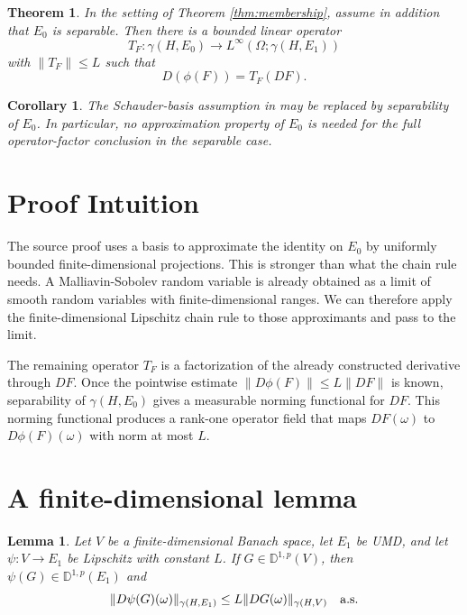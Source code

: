 \documentclass[11pt]{article}
\newtheorem{theorem}{Theorem}
\newtheorem{lemma}{Lemma}
\newtheorem{corollary}{Corollary}
\newcommand{\D}{\mathbb{D}}
\newcommand{\g}{\gamma}
\begin{document}
\begin{theorem}\label{thm:separable-factor}
In the setting of Theorem \ref{thm:membership}, assume in addition that
\(E_0\) is separable.  Then there is a bounded linear operator
\[
  T_F:\g(H,E_0)\to L^\infty(\Omega;\g(H,E_1))
\]
with \(\|T_F\|\leq L\) such that
\[
  D(\phi(F))=T_F(DF).
\]
\end{theorem}

\begin{corollary}
The Schauder-basis assumption in \cite[Proposition 3.10]{PV} may be replaced
by separability of \(E_0\).  In particular, no approximation property of
\(E_0\) is needed for the full operator-factor conclusion in the separable
case.
\end{corollary}

\section*{Proof Intuition}

The source proof uses a basis to approximate the identity on \(E_0\) by
uniformly bounded finite-dimensional projections.  This is stronger than what
the chain rule needs.  A Malliavin-Sobolev random variable is already obtained
as a limit of smooth random variables with finite-dimensional ranges.  We can
therefore apply the finite-dimensional Lipschitz chain rule to those
approximants and pass to the limit.

The remaining operator \(T_F\) is a factorization of the already constructed
derivative through \(DF\).  Once the pointwise estimate
\(\|D\phi(F)\|\leq L\|DF\|\) is known, separability of \(\g(H,E_0)\) gives a
measurable norming functional for \(DF\).  This norming functional produces a
rank-one operator field that maps \(DF(\omega)\) to \(D\phi(F)(\omega)\) with
norm at most \(L\).

\section*{A finite-dimensional lemma}

\begin{lemma}\label{lem:finite}
Let \(V\) be a finite-dimensional Banach space, let \(E_1\) be UMD, and let
\(\psi:V\to E_1\) be Lipschitz with constant \(L\).  If
\(G\in\D^{1,p}(V)\), then \(\psi(G)\in\D^{1,p}(E_1)\) and
\[
  \|D\psi(G)(\omega)\|_{\g(H,E_1)}
  \leq L\|DG(\omega)\|_{\g(H,V)}
  \quad\hbox{a.s.}
\]
\end{lemma}
\end{document}
